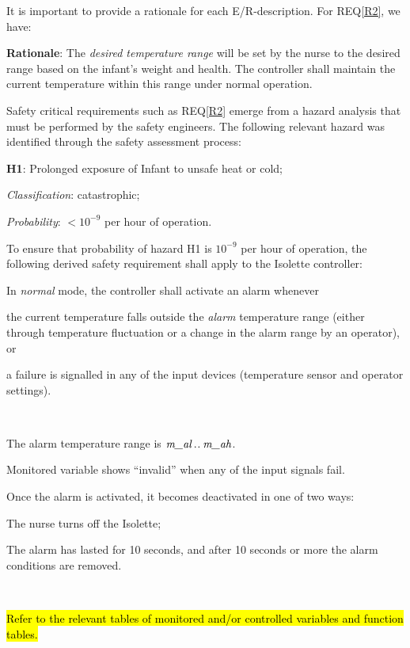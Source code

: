 It is important to provide a rationale for each E/R-description.  For REQ\ref{R2}, we have:

\smallskip
\noindent \textbf{Rationale}: The \emph{desired temperature range} will be set by the nurse to the desired range based on the infant's weight and health. The controller shall maintain the current temperature within this range under normal operation.

Safety critical requirements such as REQ\ref{R2} emerge from a hazard analysis that must be performed by the safety engineers. The following relevant hazard was identified through the safety assessment process:
\begin{mylist}
\item \textbf{H1}: Prolonged exposure of Infant to unsafe heat or cold;
\item \emph{Classification}: catastrophic;
\item \emph{Probability}: $<10^{-9}$ per hour of operation.
\end{mylist}

\noindent To ensure that probability of hazard H1 is $10^{-9}$ per hour of operation, the following derived safety requirement shall apply to the Isolette controller: 

{In \emph{normal} mode, the controller shall activate an alarm whenever 

\begin{mylist}
\item the current temperature falls outside the \emph{alarm} temperature range (either through temperature fluctuation or a change in the alarm range by an operator), or
\item a failure is signalled in any of the input devices (temperature sensor and operator settings).
\end{mylist}~}
{The alarm temperature range is $\textit{m\_al}\mathbin{.\mkern1mu.}\textit{m\_ah}$.

Monitored variable  
shows ``invalid'' when any of the input signals fail.}
\label{R3}


{Once the alarm is activated, it becomes deactivated in one of two ways:
\begin{mylist}
\item The nurse turns off the Isolette;
\item The alarm has lasted for 10 seconds, and after 10 seconds or more the alarm conditions are removed.
\end{mylist}~\\}
{\hl{Refer to the relevant tables of monitored and/or controlled variables and function tables.}}
\label{R4}

